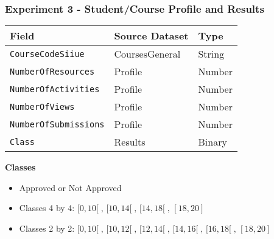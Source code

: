 \begin{frame}
\frametitle{Experiment 3 - Student/Course Profile and Results}

{

\small
\centering

\begin{tabular}{| l | l | l |}
    \hline
    \textbf{Field}               & \textbf{Source Dataset} & \textbf{Type} \\ \hline
    \texttt{CourseCodeSiiue}     & CoursesGeneral          & String        \\ \hline
    \texttt{NumberOfResources}   & Profile                 & Number        \\ \hline
    \texttt{NumberOfActivities}  & Profile                 & Number        \\ \hline
    \texttt{NumberOfViews}       & Profile                 & Number        \\ \hline
    \texttt{NumberOfSubmissions} & Profile                 & Number        \\ \hline
    \texttt{Class}               & Results                 & Binary        \\ \hline
\end{tabular}

}

\vspace{0.5cm}

\textbf{Classes}

\begin{itemize}
    \item Approved or Not Approved
    \item Classes 4 by 4: \( [0, 10[\;,\, [10, 14[\;,\, [14, 18[\;,\, [18, 20] \)
    \item Classes 2 by 2: \( [0, 10[\;,\, [10, 12[\;,\, [12, 14[\;,\, [14, 16[\;,\, [16, 18[\;,\, [18, 20] \)
\end{itemize}

\end{frame}

